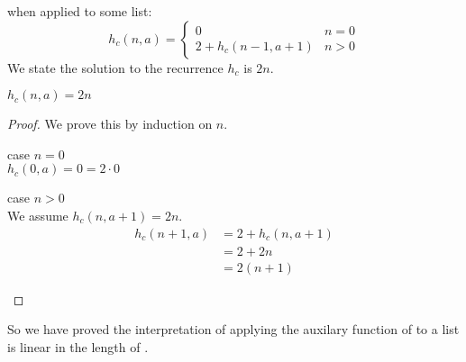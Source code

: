  when applied to some list:
%
\begin{equation}
  h_c(n,a) = \begin{cases}
    0 & n = 0 \\
    2 + h_c(n-1,a+1) & n > 0
  \end{cases}
\end{equation}
%
We state the solution to the recurrence $h_c$ is $2n$.
%
\begin{theorem}
  \label{lem:fr_interp_h_cost}
  $h_c(n,a) = 2n$
\end{theorem}
%
\begin{proof}
  We prove this by induction on $n$.
  \begin{description}
    \item{case $n=0$}\hfill \\
      $h_c(0,a) = 0 = 2 \cdot 0$
    \item{case $n>0$}\hfill \\
      We assume $h_c(n,a+1) = 2n$.
      \begin{align*}
        h_c(n+1,a) &= 2 + h_c(n,a+1) \\
                   &= 2 + 2n  \\
                   &= 2(n+1)
      \end{align*}
  \end{description}
\end{proof}
%
So we have proved the interpretation of applying the auxilary function of
 to a list is linear in the length of .



